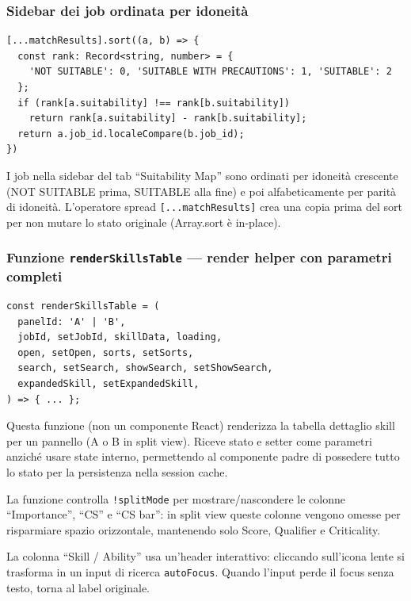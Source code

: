 \documentclass[a4paper,12pt]{article}
\begin{document}
\subsubsection{Sidebar dei job ordinata per idoneit\`{a}}

\begin{lstlisting}
[...matchResults].sort((a, b) => {
  const rank: Record<string, number> = {
    'NOT SUITABLE': 0, 'SUITABLE WITH PRECAUTIONS': 1, 'SUITABLE': 2
  };
  if (rank[a.suitability] !== rank[b.suitability])
    return rank[a.suitability] - rank[b.suitability];
  return a.job_id.localeCompare(b.job_id);
})
\end{lstlisting}

\noindent I job nella sidebar del tab ``Suitability Map'' sono ordinati per
idoneit\`{a} crescente (NOT SUITABLE prima, SUITABLE alla fine) e
poi alfabeticamente per parit\`{a} di idoneit\`{a}. L'operatore spread
\texttt{[...matchResults]} crea una copia prima del sort per non mutare
lo stato originale (Array.sort \`{e} in-place).

\subsubsection{Funzione \texttt{renderSkillsTable} --- render helper con parametri completi}

\begin{lstlisting}
const renderSkillsTable = (
  panelId: 'A' | 'B',
  jobId, setJobId, skillData, loading,
  open, setOpen, sorts, setSorts,
  search, setSearch, showSearch, setShowSearch,
  expandedSkill, setExpandedSkill,
) => { ... };
\end{lstlisting}

\noindent Questa funzione (non un componente React) renderizza la tabella dettaglio
skill per un pannello (A o B in split view). Riceve stato e setter come
parametri anzich\'{e} usare state interno, permettendo al componente
padre di possedere tutto lo stato per la persistenza nella session cache.

La funzione controlla \texttt{!splitMode} per mostrare/nascondere le
colonne ``Importance'', ``CS'' e ``CS bar'': in split view queste colonne
vengono omesse per risparmiare spazio orizzontale, mantenendo solo
Score, Qualifier e Criticality.

La colonna ``Skill / Ability'' usa un'header interattivo: cliccando
sull'icona lente si trasforma in un input di ricerca \texttt{autoFocus}.
Quando l'input perde il focus senza testo, torna al label originale.
\end{document}
